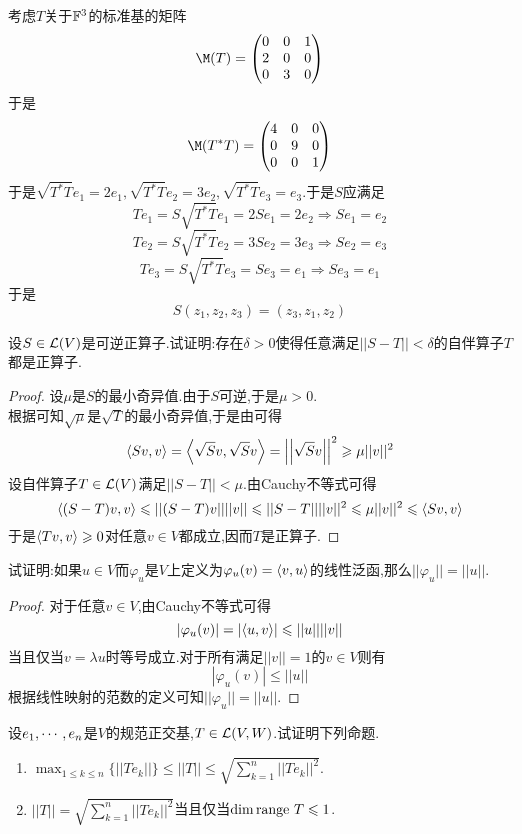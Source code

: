 \documentclass{ctexart}
\begin{document}
\begin{solution}
    考虑$T$关于$\mathbb{F}^3$的标准基的矩阵
    \[\M(T)=\begin{pmatrix}
        0&0&1\\2&0&0\\0&3&0
    \end{pmatrix}\]
    于是
    \[\M(T^*T)=\begin{pmatrix}
        4&0&0\\0&9&0\\0&0&1
    \end{pmatrix}\]
    于是$\sqrt{T^*T}e_1=2e_1,\sqrt{T^*T}e_2=3e_2,\sqrt{T^*T}e_3=e_3$.于是$S$应满足
    \[Te_1=S\sqrt{T^*T}e_1=2Se_1=2e_2\Rightarrow Se_1=e_2\]
    \[Te_2=S\sqrt{T^*T}e_2=3Se_2=3e_3\Rightarrow Se_2=e_3\]
    \[Te_3=S\sqrt{T^*T}e_3=Se_3=e_1\Rightarrow Se_3=e_1\]
    于是
    \[S(z_1,z_2,z_3)=\left(z_3,z_1,z_2\right)\]
\end{solution}
\begin{problem}[16.]
    设$S\in\mathcal{L}(V)$是可逆正算子.试证明:存在$\delta>0$使得任意满足$||S-T||<\delta$的自伴算子$T$都是正算子.
\end{problem}
\begin{proof}
    设$\mu$是$S$的最小奇异值.由于$S$可逆,于是$\mu>0$.\\
    根据可知$\sqrt{\mu}$是$\sqrt{T}$的最小奇异值,于是由可得
    \[\left\langle{Sv},{v}\right\rangle=\left\langle{\sqrt{S}v},{\sqrt{S}v}\right\rangle=\left|\left|\sqrt{S}v\right|\right|^2\geqslant\mu||v||^2\]
    设自伴算子$T\in\mathcal{L}(V)$满足$||S-T||<\mu$.由Cauchy不等式可得
    \[\left\langle{(S-T)v},{v}\right\rangle\leqslant||(S-T)v||||v||\leqslant||S-T||||v||^2\leqslant\mu||v||^2\leqslant\left\langle{Sv},{v}\right\rangle\]
    于是$\left\langle{Tv},{v}\right\rangle\geqslant0$对任意$v\in V$都成立,因而$T$是正算子.
\end{proof}
\begin{problem}[17.]
    试证明:如果$u\in V$而$\varphi_u$是$V$上定义为$\varphi_u(v)=\left\langle{v},{u}\right\rangle$的线性泛函,那么$||\varphi_u||=||u||$.
\end{problem}
\begin{proof}
    对于任意$v\in V$,由Cauchy不等式可得
    \[\left|\varphi_u(v)\right|=\left|\left\langle{u},{v}\right\rangle\right|\leqslant||u||||v||\]
    当且仅当$v=\lambda u$时等号成立.对于所有满足$||v||=1$的$v\in V$则有
    \[\left|\varphi_u(v)\right|\leqslant||u||\]
    根据线性映射的范数的定义可知$||\varphi_u||=||u||$.
\end{proof}
\begin{problem}[18.]
    设${e}_1,\cdots,{e}_{n}$是$V$的规范正交基,$T\in\mathcal{L}(V,W)$.试证明下列命题.
    \begin{enumerate}[label=\tbf{(\arabic*)}]
        \item $\displaystyle\max_{1\leqslant k\leqslant n}\{||Te_k||\}\leqslant||T||\leqslant\sqrt{\sum_{k=1}^{n}||Te_k||^2}$.
        \item $\displaystyle||T||=\sqrt{\sum_{k=1}^{n}||Te_k||^2}$当且仅当$\dim\text{range } T\leqslant1$.
    \end{enumerate}
\end{problem}
\end{document}
